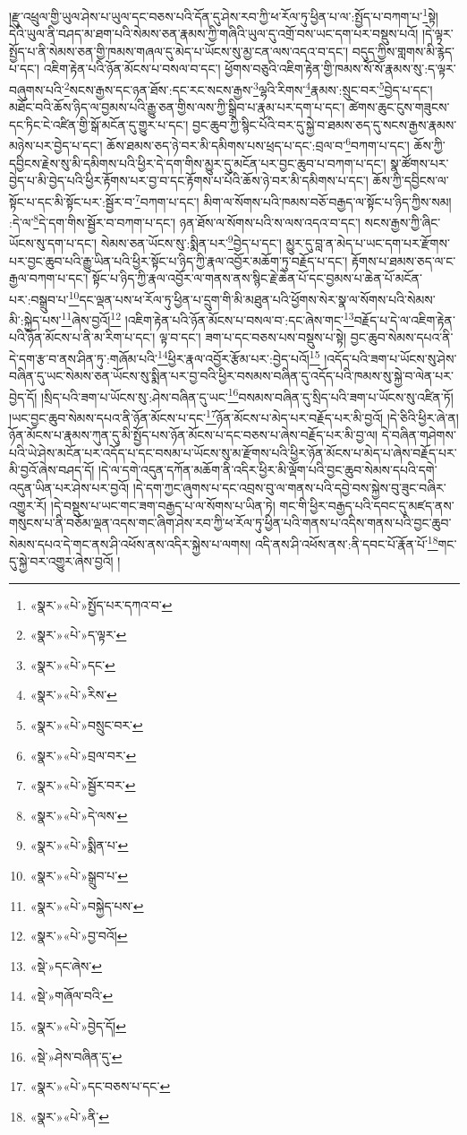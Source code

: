 །རྫུ་འཕྲུལ་གྱི་ཡུལ་ཤེས་པ་ཡུལ་དང་བཅས་པའི་དོན་དུ་ཤེས་རབ་ཀྱི་ཕ་རོལ་ཏུ་ཕྱིན་པ་ལ་:སྤྱོད་པ་བཀག་པ་\footnote{«སྣར་»«པེ་»སྤྱོད་པར་དཀའ་བ་}སྟེ། དེའི་ཡུལ་ནི་བཤད་མ་ཐག་པའི་སེམས་ཅན་རྣམས་ཀྱི་གཞིའི་ཡུལ་དུ་འགྲོ་བས་ཡང་དག་པར་བསྡུས་པའོ། །དེ་ལྟར་སྤྱོད་པ་ནི་སེམས་ཅན་གྱི་ཁམས་གཞལ་དུ་མེད་པ་ཡོངས་སུ་མྱ་ངན་ལས་འདའ་བ་དང་། བདུད་ཀྱིས་གླགས་མི་རྙེད་པ་དང་། འཇིག་རྟེན་པའི་ཉོན་མོངས་པ་བསལ་བ་དང་། ཕྱོགས་བཅུའི་འཇིག་རྟེན་གྱི་ཁམས་སོ་སོ་རྣམས་སུ་:ད་ལྟར་བཞུགས་པའི་\footnote{«སྣར་»«པེ་»ད་ལྟར་}སངས་རྒྱས་དང་ཉན་ཐོས་:དང་རང་སངས་རྒྱས་\footnote{«སྣར་»«པེ་»དང་}ལྷའི་རིགས་\footnote{«སྣར་»«པེ་»རིས་}རྣམས་:སྲུང་བར་\footnote{«སྣར་»«པེ་»བསྲུང་བར་}བྱེད་པ་དང་། མཐོང་བའི་ཆོས་ཉིད་ལ་བྱམས་པའི་རྒྱུ་ཅན་གྱིས་ལས་ཀྱི་སྒྲིབ་པ་རྣམ་པར་དག་པ་དང་། ཚེགས་ཆུང་ངུས་གཟུངས་དང་ཏིང་ངེ་འཛིན་གྱི་སྒོ་མངོན་དུ་གྱུར་པ་དང་། བྱང་ཆུབ་ཀྱི་སྙིང་པོའི་བར་དུ་སྐྱེ་བ་ཐམས་ཅད་དུ་སངས་རྒྱས་རྣམས་མཉེས་པར་བྱེད་པ་དང་། ཆོས་ཐམས་ཅད་ཉེ་བར་མི་དམིགས་པས་ཕྲད་པ་དང་:བྲལ་བ་\footnote{«སྣར་»«པེ་»བྲལ་བར་}བཀག་པ་དང་། ཆོས་ཀྱི་དབྱིངས་རྗེས་སུ་མི་དམིགས་པའི་ཕྱིར་དེ་དག་གིས་མྱུར་དུ་མངོན་པར་བྱང་ཆུབ་པ་བཀག་པ་དང་། སྣ་ཚོགས་པར་བྱེད་པ་མི་བྱེད་པའི་ཕྱིར་རྟོགས་པར་བྱ་བ་དང་རྟོགས་པ་པོའི་ཆོས་ཉེ་བར་མི་དམིགས་པ་དང་། ཆོས་ཀྱི་དབྱིངས་ལ་སྟོང་པ་དང་མི་སྟོང་པར་:སྦྱོར་བ་\footnote{«སྣར་»«པེ་»སྦྱོར་བར་}བཀག་པ་དང་། མིག་ལ་སོགས་པའི་ཁམས་བཅོ་བརྒྱད་ལ་སྟོང་པ་ཉིད་ཀྱིས་སམ། :དེ་ལ་\footnote{«སྣར་»«པེ་»དེ་ལས་}དེ་དག་གིས་སྦྱོར་བ་བཀག་པ་དང་། ཉན་ཐོས་ལ་སོགས་པའི་ས་ལས་འདའ་བ་དང་། སངས་རྒྱས་ཀྱི་ཞིང་ཡོངས་སུ་དག་པ་དང་། སེམས་ཅན་ཡོངས་སུ་:སྨིན་པར་\footnote{«སྣར་»«པེ་»སྨིན་པ་}བྱེད་པ་དང་། མྱུར་དུ་བླ་ན་མེད་པ་ཡང་དག་པར་རྫོགས་པར་བྱང་ཆུབ་པའི་རྒྱུ་ཡིན་པའི་ཕྱིར་སྟོང་པ་ཉིད་ཀྱི་རྣལ་འབྱོར་མཆོག་ཏུ་བརྗོད་པ་དང་། རྟོགས་པ་ཐམས་ཅད་ལ་ང་རྒྱལ་བཀག་པ་དང་། སྟོང་པ་ཉིད་ཀྱི་རྣལ་འབྱོར་ལ་གནས་ནས་སྙིང་རྗེ་ཆེན་པོ་དང་བྱམས་པ་ཆེན་པོ་མངོན་པར་:བསྒྲུབ་པ་\footnote{«སྣར་»«པེ་»སྒྲུབ་པ་}དང་ལྡན་པས་ཕ་རོལ་ཏུ་ཕྱིན་པ་དྲུག་གི་མི་མཐུན་པའི་ཕྱོགས་སེར་སྣ་ལ་སོགས་པའི་སེམས་མི་:སྐྱེད་པས་\footnote{«སྣར་»«པེ་»བསྐྱེད་པས་}ཞེས་བྱའོ།\footnote{«སྣར་»«པེ་»བྱ་བའོ།} །འཇིག་རྟེན་པའི་ཉོན་མོངས་པ་བསལ་བ་:དང་ཞེས་གང་\footnote{«སྡེ་»དང་ཞེས་}བརྗོད་པ་དེ་ལ་འཇིག་རྟེན་པའི་ཉོན་མོངས་པ་ནི་མ་རིག་པ་དང་། ལྟ་བ་དང་། ཟག་པ་དང་བཅས་པས་བསྡུས་པ་སྟེ། བྱང་ཆུབ་སེམས་དཔའ་ནི་དེ་དག་རྩ་བ་ནས་ཤིན་ཏུ་:གཞོམ་པའི་\footnote{«སྡེ་»གཞོལ་བའི་}ཕྱིར་རྣལ་འབྱོར་རྩོམ་པར་:བྱེད་པའོ།\footnote{«སྣར་»«པེ་»བྱེད་དོ།} །འདོད་པའི་ཟག་པ་ཡོངས་སུ་ཤེས་བཞིན་དུ་ཡང་སེམས་ཅན་ཡོངས་སུ་སྨིན་པར་བྱ་བའི་ཕྱིར་བསམས་བཞིན་དུ་འདོད་པའི་ཁམས་སུ་སྐྱེ་བ་ལེན་པར་བྱེད་དོ། །སྲིད་པའི་ཟག་པ་ཡོངས་སུ་:ཤེས་བཞིན་དུ་ཡང་\footnote{«སྡེ་»ཤེས་བཞིན་དུ་}བསམས་བཞིན་དུ་སྲིད་པའི་ཟག་པ་ཡོངས་སུ་འཛིན་ཏོ། །ཡང་བྱང་ཆུབ་སེམས་དཔའ་ནི་ཉོན་མོངས་པ་དང་\footnote{«སྣར་»«པེ་»དང་བཅས་པ་དང་}ཉོན་མོངས་པ་མེད་པར་བརྗོད་པར་མི་བྱའོ། །དེ་ཅིའི་ཕྱིར་ཞེ་ན། ཉོན་མོངས་པ་རྣམས་ཀུན་དུ་མི་སྤྱོད་པས་ཉོན་མོངས་པ་དང་བཅས་པ་ཞེས་བརྗོད་པར་མི་བྱ་ལ། དེ་བཞིན་གཤེགས་པའི་ཡེ་ཤེས་མངོན་པར་འདོད་པ་དང་བསམ་པ་ཡོངས་སུ་མ་རྫོགས་པའི་ཕྱིར་ཉོན་མོངས་པ་མེད་པ་ཞེས་བརྗོད་པར་མི་བྱའོ་ཞེས་བཤད་དོ། །དེ་ལ་དགེ་འདུན་དཀོན་མཆོག་ནི་འདིར་ཕྱིར་མི་ལྡོག་པའི་བྱང་ཆུབ་སེམས་དཔའི་དགེ་འདུན་ཡིན་པར་ཤེས་པར་བྱའོ། །དེ་དག་ཀྱང་ཞུགས་པ་དང་འབྲས་བུ་ལ་གནས་པའི་དབྱེ་བས་སྐྱེས་བུ་ཟུང་བཞིར་འགྱུར་རོ། །དེ་བསྡུས་པ་ཡང་གང་ཟག་བརྒྱད་པ་ལ་སོགས་པ་ཡིན་ཏེ། གང་གི་ཕྱིར་བརྒྱད་པའི་དབང་དུ་མཛད་ནས་གསུངས་པ་ནི་བཅོམ་ལྡན་འདས་གང་ཞིག་ཤེས་རབ་ཀྱི་ཕ་རོལ་ཏུ་ཕྱིན་པའི་གནས་པ་འདིས་གནས་པའི་བྱང་ཆུབ་སེམས་དཔའ་དེ་གང་ནས་ཤི་འཕོས་ནས་འདིར་སྐྱེས་པ་ལགས། འདི་ནས་ཤི་འཕོས་ནས་:ནི་དབང་པོ་རྣོན་པོ་\footnote{«སྣར་»«པེ་»ནི་}གང་དུ་སྐྱེ་བར་འགྱུར་ཞེས་བྱའོ། །
